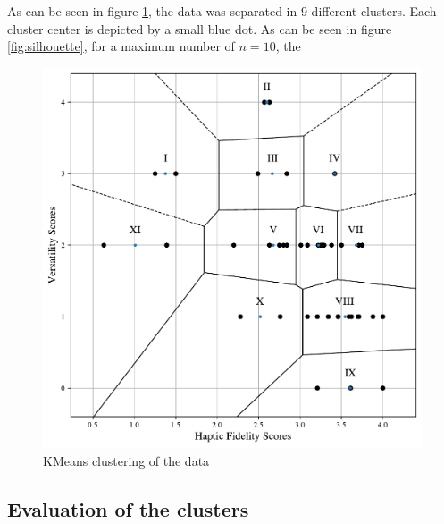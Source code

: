 As can be seen in figure \ref{fig:kmeans}, the data was separated in 9 different clusters. Each cluster center is depicted by a small blue dot. As can be seen in figure \ref{fig:silhouette}, for a maximum number of $n=10$, the 

\begin{figure}[htbp]
    \centering
    \includegraphics[width=\columnwidth]{figures/literature_data.pdf} 
    \caption{KMeans clustering of the data}
    \label{fig:kmeans}
\end{figure}


\subsection{Evaluation of the clusters}

